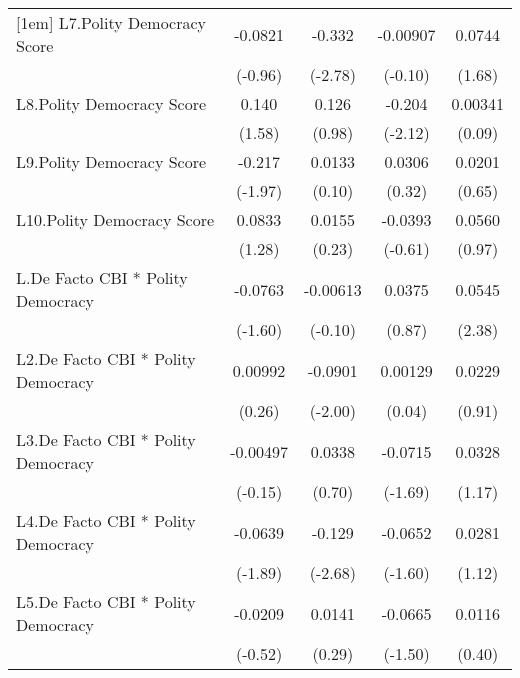 {\begin{longtable}{l*{4}{c}}
[1em]
L7.Polity Democracy Score&  -0.0821         &   -0.332\sym{**} & -0.00907         &   0.0744         \\
                &  (-0.96)         &  (-2.78)         &  (-0.10)         &   (1.68)         \\
[1em]
L8.Polity Democracy Score&    0.140         &    0.126         &   -0.204\sym{*}  &  0.00341         \\
                &   (1.58)         &   (0.98)         &  (-2.12)         &   (0.09)         \\
[1em]
L9.Polity Democracy Score&   -0.217\sym{*}  &   0.0133         &   0.0306         &   0.0201         \\
                &  (-1.97)         &   (0.10)         &   (0.32)         &   (0.65)         \\
[1em]
L10.Polity Democracy Score&   0.0833         &   0.0155         &  -0.0393         &   0.0560         \\
                &   (1.28)         &   (0.23)         &  (-0.61)         &   (0.97)         \\
[1em]
L.De Facto CBI * Polity Democracy&  -0.0763         & -0.00613         &   0.0375         &   0.0545\sym{*}  \\
                &  (-1.60)         &  (-0.10)         &   (0.87)         &   (2.38)         \\
[1em]
L2.De Facto CBI * Polity Democracy&  0.00992         &  -0.0901\sym{*}  &  0.00129         &   0.0229         \\
                &   (0.26)         &  (-2.00)         &   (0.04)         &   (0.91)         \\
[1em]
L3.De Facto CBI * Polity Democracy& -0.00497         &   0.0338         &  -0.0715         &   0.0328         \\
                &  (-0.15)         &   (0.70)         &  (-1.69)         &   (1.17)         \\
[1em]
L4.De Facto CBI * Polity Democracy&  -0.0639         &   -0.129\sym{**} &  -0.0652         &   0.0281         \\
                &  (-1.89)         &  (-2.68)         &  (-1.60)         &   (1.12)         \\
[1em]
L5.De Facto CBI * Polity Democracy&  -0.0209         &   0.0141         &  -0.0665         &   0.0116         \\
                &  (-0.52)         &   (0.29)         &  (-1.50)         &   (0.40)         \\

\end{longtable}}
